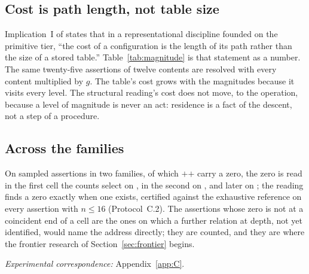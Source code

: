 \documentclass[pdflatex,sn-mathphys-num]{sn-jnl}
\theoremstyle{thmstyleone}%
\theoremstyle{thmstyletwo}%
\theoremstyle{thmstylethree}%
\newcommand{\PA}{\cite{Swanagon2026PA}}
\newcommand{\q}[1]{``#1''}        %
\begin{document}
\subsection{Cost is path length, not table size}
Implication~I of \PA{} states that in a representational discipline founded on the primitive tier, \q{the cost of a configuration is the length of its path rather than the size of a stored table.} Table~\ref{tab:magnitude} is that statement as a number. The same twenty-five assertions of twelve contents are resolved with every content multiplied by $g$. The table's cost grows with the magnitudes because it visits every level. The structural reading's cost does not move, to the operation, because a level of magnitude is never an act: residence is a fact of the descent, not a step of a procedure.

\begin{table}[!htbp]
\centering
\caption{Magnitude invariance. $n=12$, the same assertions with every content multiplied by $g$; means over 25 (Protocol~C.10).}
\label{tab:magnitude}

\end{table}

\subsection{Across the families}
On \selTotal{} sampled assertions in two families, of which \selFirst{}$+$\selSecond{}$+$\selLater{} carry a zero, the zero is read in the first cell the counts select on \selFirst{}, in the second on \selSecond{}, and later on \selLater{}; the reading finds a zero exactly when one exists, certified against the exhaustive reference on every assertion with $n\le16$ (Protocol~C.2). The assertions whose zero is not at a coincident end of a cell are the ones on which a further relation at depth, not yet identified, would name the address directly; they are counted, and they are where the frontier research of Section~\ref{sec:frontier} begins.

\begin{table}[!htbp]
\centering
\caption{The selected partition on the families (Protocol~C.7). Family A: magnitudes $1$--$9$, repeated; family B: distinct magnitudes over a widening range. Reads are configurations formed to the first zero or to exhaustion of the admitted cells.}
\label{tab:selection}
\small

\end{table}

\noindent\emph{Experimental correspondence:} Appendix~\ref{app:C}.
\end{document}
